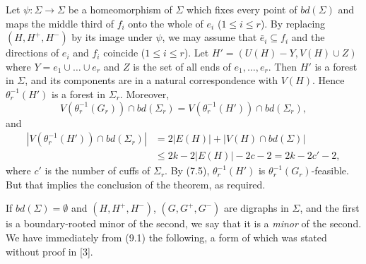 Let $\psi \colon \Sigma \to \Sigma$ be a homeomorphism of $\Sigma$ which fixes every point of $bd(\Sigma)$ and maps the middle third of $f_i$ onto the whole of $e_i$ ($1 \le i \le r$). By replacing $(H, H^+, H^-)$ by its image under $\psi$, we may assume that $\bar{e}_i \subseteq f_i$ and the directions of $e_i$ and $f_i$ coincide ($1 \le i \le r$). Let $H' = (U(H) - Y, V(H) \cup Z)$ where $Y = e_1 \cup \dots \cup e_r$ and $Z$ is the set of all ends of $e_1, \dots, e_r$. Then $H'$ is a forest in $\Sigma$, and its components are in a natural correspondence with $V(H)$. Hence $\theta_r^{-1}(H')$ is a forest in $\Sigma_r$. Moreover,
\begin{equation*}
V(\theta_r^{-1}(G_r)) \cap bd(\Sigma_r) = V(\theta_r^{-1}(H')) \cap bd(\Sigma_r),
\end{equation*}
and
\begin{align*}
|V(\theta_r^{-1}(H')) \cap bd(\Sigma_r)| &= 2 |E(H)| + |V(H) \cap bd(\Sigma)| \\
&\le 2k - 2 |E(H)| - 2c - 2 = 2k - 2c' - 2,
\end{align*}
where $c'$ is the number of cuffs of $\Sigma_r$. By (7.5), $\theta_r^{-1}(H')$ is $\theta_r^{-1}(G_r)$-feasible. But that implies the conclusion of the theorem, as required.

If $bd(\Sigma) = \emptyset$ and $(H, H^+, H^-)$, $(G, G^+, G^-)$ are digraphs in $\Sigma$, and the first is a boundary-rooted minor of the second, we say that it is a \textit{minor} of the second. We have immediately from (9.1) the following, a form of which was stated without proof in [3].
